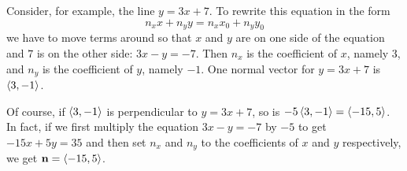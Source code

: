 \begin{eg}
Consider, for example, the line $y=3x+7$. To rewrite this equation in the form 
$$
n_xx+n_yy= n_xx_0+n_yy_0
$$ 
we have to move terms around so that $x$ and
$y$ are on one side of the equation and $7$ is  on the other side:
 $3x-y=-7$. Then $n_x$ is the coefficient of $x$, namely $3$, and $n_y$
is the coefficient of $y$, namely $-1$. One normal vector
for $y=3x+7$ is $\left< 3,-1\right> $. 


Of course, if $\left< 3,-1\right> $ is perpendicular to $y=3x+7$, so is 
$-5\left< 3,-1\right> =\left< -15,5\right> $.
In fact, if we first multiply the equation $3x-y=-7$ by $-5$ to
get $-15x+5y=35$ and then set $n_x$ and $n_y$ to the coefficients of $x$
and $y$ respectively, we get $\mathbf{n}=\left< -15,5\right> $.
\end{eg}



